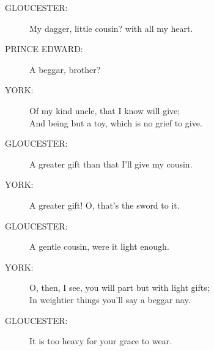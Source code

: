 \documentclass{article}
\begin{document}
\begin{description}
\item[GLOUCESTER:] 
\hspace{1pt}My dagger, little cousin? with all my heart.\\
\end{description}
\begin{description}
\item[PRINCE EDWARD:] 
\hspace{1pt}A beggar, brother?\\
\end{description}
\begin{description}
\item[YORK:] 
\hspace{1pt}Of my kind uncle, that I know will give;\\
\hspace{1pt}And being but a toy, which is no grief to give.\\
\end{description}
\begin{description}
\item[GLOUCESTER:] 
\hspace{1pt}A greater gift than that I'll give my cousin.\\
\end{description}
\begin{description}
\item[YORK:] 
\hspace{1pt}A greater gift! O, that's the sword to it.\\
\end{description}
\begin{description}
\item[GLOUCESTER:] 
\hspace{1pt}A gentle cousin, were it light enough.\\
\end{description}
\begin{description}
\item[YORK:] 
\hspace{1pt}O, then, I see, you will part but with light gifts;\\
\hspace{1pt}In weightier things you'll say a beggar nay.\\
\end{description}
\begin{description}
\item[GLOUCESTER:] 
\hspace{1pt}It is too heavy for your grace to wear.\\
\end{description}
\end{document}
